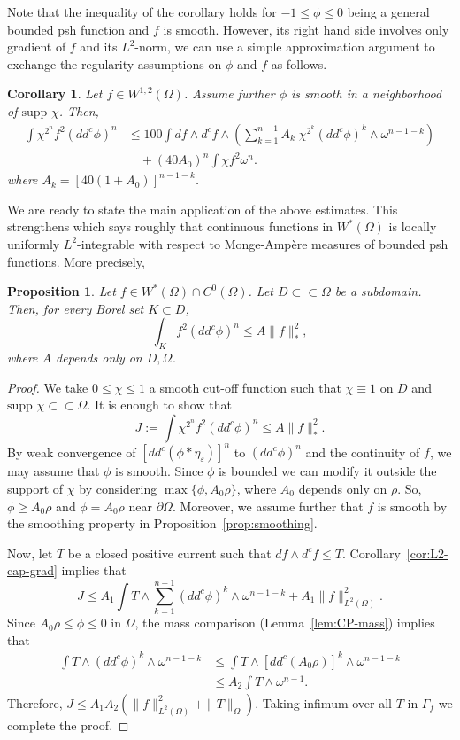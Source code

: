 \documentclass{amsart}
\renewcommand{\d}{\partial}
\newcommand{\veps}{\varepsilon}
\newcommand{\om}{\omega}
\newcommand{\Ga}{\Gamma}
\newcommand{\Om}{\Omega}
\newcommand{\supp}{\mbox{supp }}
\newtheorem{prop}[thm]{Proposition}
\newtheorem{cor}[thm]{Corollary}
\theoremstyle{definition}
\numberwithin{thm}{section}
\numberwithin{equation}{section}
\renewcommand{\[}{\begin{equation}}
\renewcommand{\]}{\end{equation}}
\newcommand{\wed}{\wedge}
\begin{document}
Note that the inequality of the corollary holds for $-1 \leq \phi \leq 0$ being a general bounded psh function and $f$ is smooth. However, its right hand side involves only gradient of $f$ and its $L^2$-norm, we can  use a simple approximation argument to  exchange the regularity assumptions on $\phi$ and $f$ as follows.

\begin{cor}\label{cor:L2-cap-general} Let $f\in W^{1,2}(\Om)$. Assume further $\phi$ is smooth in a neighborhood of $\supp\chi$.  Then,
$$\begin{aligned}
	\int \chi^{2^{n}} f^2 (dd^c\phi)^n &\leq 100 \int df \wed d^c f \wed \left( \sum_{k=1}^{n-1} A_k \;\chi^{2^{k}}  (dd^c \phi)^{k} \wed \om^{n-1-k} \right) \\ &\quad + (40A_0)^n \int \chi f^2 \om^n.
\end{aligned}$$
where $A_k =[40(1+ A_0)]^{n-1-k}$.
\end{cor}

We are ready to state the main application of the above estimates. This strengthens \cite[Lemma~2.5]{DMV} which says roughly that continuous functions in $W^*(\Om)$ is locally uniformly $L^2$-integrable with respect to  Monge-Amp\`ere measures of bounded psh functions. More precisely, 

\begin{prop} \label{prop:L2-cap} Let $f\in W^*(\Om) \cap C^0(\Om)$. Let $D\subset \subset \Om$ be a subdomain. Then, for every  Borel set $K\subset D$,
$$
	\int_K  f^2 (dd^c \phi)^n \leq A \|f\|_*^2,
$$
where $A$ depends only on $D, \Om$.
\end{prop}


\begin{proof} We take $0\leq \chi \leq 1$ a smooth cut-off function such that $\chi \equiv 1$ on $D$ and $\supp \chi \subset\subset \Om$.  It is enough to show that
$$	J:=\int \chi^{2^n}  f^2 (dd^c \phi)^n \leq A\|f\|_*^2.
$$
By weak convergence of $[dd^c (\phi*\eta_\veps)]^n$ to $(dd^c\phi)^n$ and the continuity of $f$, we may assume that $\phi$ is smooth. Since $\phi$ is bounded we can modify it outside the support of $\chi$ by considering $\max\{\phi, A_0 \rho\}$, where $A_0$ depends only on $\rho$. So, $\phi \geq A_0 \rho$ and $\phi= A_0\rho$ near $\d\Om$. Moreover, we assume further that $f$ is smooth by the smoothing property in Proposition~\ref{prop:smoothing}.


Now, let $T$ be a closed positive current such that $df \wed d^c f\leq T$. 
Corollary~\ref{cor:L2-cap-grad} implies that 
$$
	J \leq A_1 \int T \wed \sum_{k=1}^{n-1} (dd^c\phi)^k \wed \om^{n-1-k} + A_1 \|f\|_{L^2(\Om)}^2.
$$
Since $A_0 \rho \leq \phi \leq 0$ in $\Om$, the mass comparison  (Lemma~\ref{lem:CP-mass}) implies that
$$\begin{aligned}
	\int T \wed (dd^c\phi)^k \wed \om^{n-1-k} 
&\leq \int T \wed [dd^c (A_0\rho)]^k \wed \om^{n-1-k} \\
&\leq A_2 \int T\wed \om^{n-1}.
\end{aligned}$$
Therefore, $J \leq A_1A_2 (\|f\|^2_{L^2(\Om)} + \|T\|_\Om)$. Taking infimum over all $T$ in $\Ga_f$ we complete the proof.
\end{proof}
\end{document}

